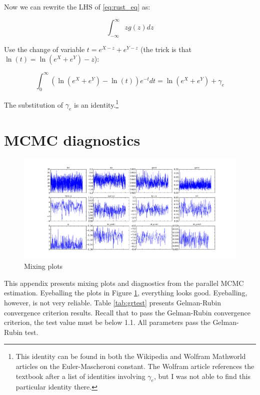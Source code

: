 Now we can rewrite the LHS of \eqref{eq:rust_eq} as:

\begin{equation}
    \int_{-\infty}^\infty z g(z) dz 
\end{equation}

Use the change of variable $t = e^{X - z} + e^{Y - z}$ (the trick is that $\ln(t) = \ln\left(e^X + e^Y\right) - z$):

\begin{equation}
    \int_{0}^\infty \left(\ln \left(e^X + e^Y\right) - \ln(t)\right) e^{-t} dt = \ln \left(e^X + e^Y\right) + \gamma_e
\end{equation}

The substitution of $\gamma_e$ is an identity.\footnote{This identity can be found in both the Wikipedia and Wolfram Mathworld articles on the Euler-Mascheroni constant.  The Wolfram article references the textbook \citet{whittaker1996course} after a list of identities involving $\gamma_e$, but I was not able to find this particular identity there.}

\clearpage
\section{MCMC diagnostics}
\label{sec:MCMC_diag}

\begin{figure}[!ht]
    \includegraphics[scale=0.35]{pics/params_plots_big.png}
    \caption{Mixing plots}
    \label{fig:mix}
\end{figure}

This appendix presents mixing plots and diagnostics from the parallel
MCMC estimation. Eyeballing the plots in Figure \ref{fig:mix}, everything looks good.  Eyeballing,
however, is not very reliable.
Table \ref{tab:grtest} presents Gelman-Rubin convergence criterion results. Recall that to pass the
Gelman-Rubin convergence criterion, the test value must be below 1.1.
All parameters pass the Gelman-Rubin test.

